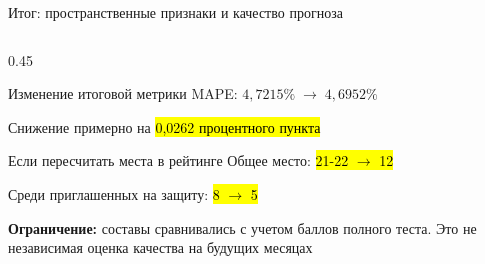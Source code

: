\begin{frame}[t]{Итог: пространственные признаки и качество прогноза}
\begin{columns}[T,onlytextwidth]
\begin{column}{0.45\textwidth}
\begin{block}{Изменение итоговой метрики}
        {\VladimirText MAPE: $4{,}7215\%\;\rightarrow\;4{,}6952\%$}\par
        \vspace{0.25ex}
        {\VladimirText Снижение примерно на \hl{0,0262 процентного пункта}}
      \end{block}
      \vspace{0.25ex}
      \begin{block}{Если пересчитать места в рейтинге}
        \VladimirText Общее место: \hl{21-22 $\rightarrow$ 12}\par
        \vspace{0.45ex}
        \VladimirText Среди приглашенных на защиту: \hl{8 $\rightarrow$ 5}
      \end{block}
      \vspace{0.45ex}
      {\fontsize{8}{9}\selectfont\color{hsegray}\textbf{Ограничение:} составы сравнивались с учетом баллов полного теста. Это не независимая оценка качества на будущих месяцах}
    \end{column}
  \end{columns}
\end{frame}

\endgroup
